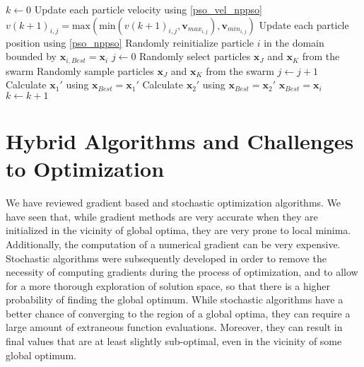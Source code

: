 \begin{breakablealgorithm}
\begin{algorithmic}[1]
\State $k \leftarrow 0$
        \State Update each particle velocity using \ref{pso_vel_nppso}
        \State $v(k+1)_{i,j} = \textrm{max}(\textrm{min}(v(k+1)_{i,j},\mathbf{v}_{max}_{i,j}),\mathbf{v}_{min}_{i,j})$
        \EndIf
        \State Update each particle position using \ref{pso_nppso}
        \State Randomly reinitialize particle $i$ in the domain bounded by 
        \EndIf
            \State $\mathbf{x}_{i,Best} = \mathbf{x}_i$
        \State $j \leftarrow 0$
        \State Randomly select particles $\mathbf{x}_J$ and $\mathbf{x}_K$ from the swarm
            \State Randomly sample particles $\mathbf{x}_J$ and $\mathbf{x}_K$ from the swarm
            \State $j \leftarrow j+1$
        \EndWhile
            \State Calculate $\mathbf{x}_1'$ using \label{nppso_interp_1}
                \State $\mathbf{x}_{Best} = \mathbf{x}_1'$
            \EndIf 
            \State Calculate $\mathbf{x}_2'$ using \label{nppso_interp_2}
                \State $\mathbf{x}_{Best} = \mathbf{x}_2'$
            \EndIf 
        \EndIf
            \State $\mathbf{x}_{Best} = \mathbf{x}_i$
        \EndIf 
    \EndFor
    $k \leftarrow k+1$
\EndWhile
\EndProcedure
\end{algorithmic}
\end{breakablealgorithm}

\section{Hybrid Algorithms and Challenges to Optimization}
We have reviewed gradient based and stochastic optimization algorithms. We have seen that, while gradient methods are very accurate when they are initialized in the vicinity of global optima, they are very prone to local minima. Additionally, the computation of a numerical gradient can be very expensive. Stochastic algorithms were subsequently developed in order to remove the necessity of computing gradients during the process of optimization, and to allow for a more thorough exploration of solution space, so that there is a higher probability of finding the global optimum. While stochastic algorithms have a better chance of converging to the region of a global optima, they can require a large amount of extraneous function evaluations. Moreover, they can result in final values that are at least slightly sub-optimal, even in the vicinity of some global optimum. 

